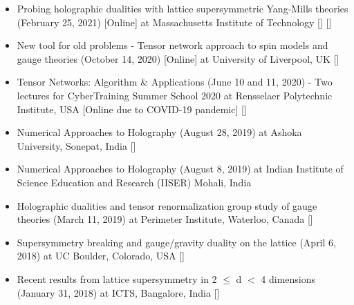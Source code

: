 \begin{itemize}
 \item Probing holographic dualities with lattice supersymmetric Yang-Mills theories 
 (February 25, 2021) [Online] at Massachusetts Institute of Technology 
   [\texttt{\textbf{}}]  [\texttt{\textbf{}}] 
 \vspace{1mm} 
 
 \item New tool for old problems - Tensor network approach to spin models and gauge theories 
 (October 14, 2020) [Online] at University of Liverpool, UK
  [\texttt{\textbf{}}] 
 \vspace{1mm} 
  
 \item Tensor Networks: Algorithm \& Applications (June 10 and 11, 2020) - Two lectures for 
 CyberTraining Summer School 2020 at Rensselaer Polytechnic Institute, USA [Online due to COVID-19 pandemic]  
   [\texttt{\textbf{}}]  
\vspace{1mm} 

 \item Numerical Approaches to Holography (August 28, 2019) at Ashoka University, Sonepat, India [\texttt{\textbf{}}] 
\vspace{1mm} 
 
 \item Numerical Approaches to Holography (August 8, 2019) at Indian Institute of Science Education and Research (IISER) Mohali, India \vspace{1mm} 
 
  \item Holographic dualities and tensor renormalization group study of gauge theories (March 11, 2019) at Perimeter Institute, Waterloo, Canada 
 [\texttt{\textbf{}}] 
\vspace{1mm} 


  \item Supersymmetry breaking and gauge/gravity duality on the lattice (April 6, 2018) at UC Boulder, Colorado, USA 
    [\texttt{\textbf{}}] 
  \vspace{1mm} 
  
  
  \item Recent results from lattice supersymmetry in 2 $\le$ d $<$ 4 dimensions (January 31, 2018) at ICTS, Bangalore, India 
   [\texttt{\textbf{}}] 
  \vspace{1mm} 
  

\end{itemize}

